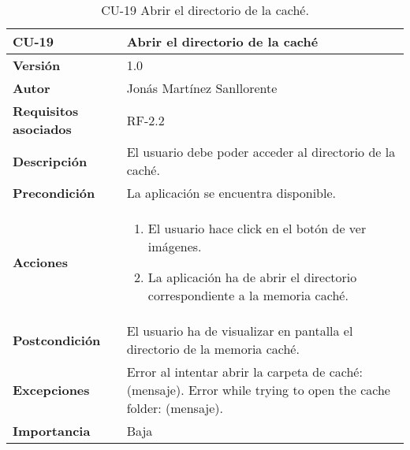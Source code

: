 \begin{table}[p]
	\centering
	\begin{tabularx}{\linewidth}{ p{} p{} }
		\toprule
		\textbf{CU-19}    & \textbf{Abrir el directorio de la caché}\\
		\toprule
		\textbf{Versión}              & 1.0    \\
		\textbf{Autor}                & Jonás Martínez Sanllorente \\
		\textbf{Requisitos asociados} & RF-2.2 \\
		\textbf{Descripción}          & El usuario debe poder acceder al directorio de la caché. \\
		\textbf{Precondición}         & La aplicación se encuentra disponible. \\
		\textbf{Acciones}             &
		\begin{enumerate}
			\def\labelenumi{\arabic{enumi}.}
			\tightlist
			\item El usuario hace click en el botón de ver imágenes.
            \item La aplicación ha de abrir el directorio correspondiente a la memoria caché.
		\end{enumerate}\\
		\textbf{Postcondición}        & El usuario ha de visualizar en pantalla el directorio de la memoria caché. \\
		\textbf{Excepciones}          & Error al intentar abrir la carpeta de caché: (mensaje).\newline
                                        Error while trying to open the cache folder: (mensaje).\\
		\textbf{Importancia}          & Baja \\
		\bottomrule
	\end{tabularx}
	\caption{CU-19 Abrir el directorio de la caché.}
\end{table}


